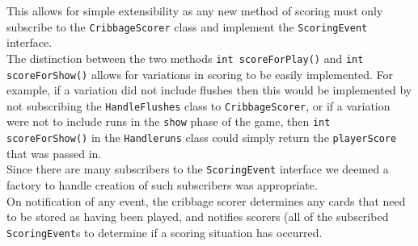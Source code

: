 \documentclass{article}
\begin{document}
This allows for simple extensibility as any new method of scoring must only subscribe to the \verb|CribbageScorer| class and implement the \verb|ScoringEvent| interface.\\[2mm]

The distinction between the two methods \verb|int scoreForPlay()| and \verb|int scoreForShow()| allows for variations in scoring to be easily implemented. For example, if a variation did not include flushes then this would be implemented by not subscribing the \verb|HandleFlushes| class to \verb|CribbageScorer|, or if a variation were not to include runs in the \verb|show| phase of the game, then \verb|int scoreForShow()| in the \verb|Handleruns| class could simply return the \verb|playerScore| that was passed in.\\[2mm]

Since there are many subscribers to the \verb|ScoringEvent| interface we deemed a factory to handle creation of such subscribers was appropriate.\\[2mm]

On notification of any event, the cribbage scorer determines any cards that need to be stored as having been played, and notifies scorers (all of the subscribed \verb|ScoringEvent|s to determine if a scoring situation has occurred.\\[2mm]
\end{document}
